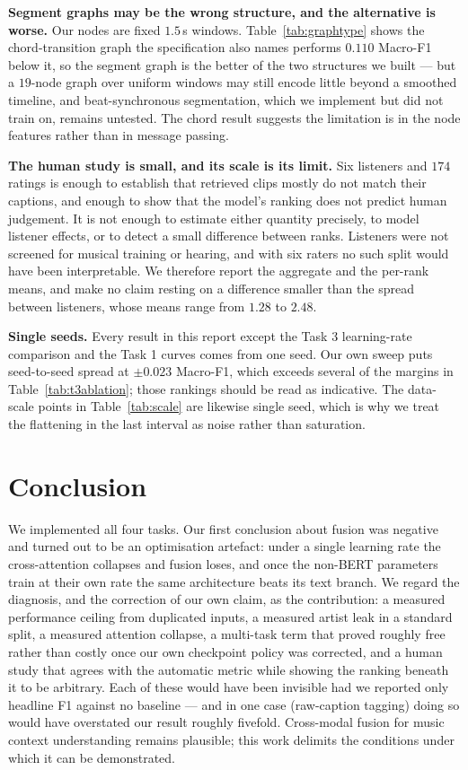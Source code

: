 \documentclass[conference]{IEEEtran}
\begin{document}
\textbf{Segment graphs may be the wrong structure, and the alternative is
worse.} Our nodes are fixed $1.5$\,s windows. Table~\ref{tab:graphtype} shows
the chord-transition graph the specification also names performs $0.110$
Macro-F1 below it, so the segment graph is the better of the two structures we
built --- but a $19$-node graph over uniform windows may still encode little
beyond a smoothed timeline, and beat-synchronous segmentation, which we
implement but did not train on, remains untested. The chord result suggests the
limitation is in the node features rather than in message passing.

\textbf{The human study is small, and its scale is its limit.} Six listeners
and $174$ ratings is enough to establish that retrieved clips mostly do not
match their captions, and enough to show that the model's ranking does not
predict human judgement. It is not enough to estimate either quantity
precisely, to model listener effects, or to detect a small difference between
ranks. Listeners were not screened for musical training or hearing, and with
six raters no such split would have been interpretable. We therefore report the
aggregate and the per-rank means, and make no claim resting on a difference
smaller than the spread between listeners, whose means range from $1.28$ to
$2.48$.

\textbf{Single seeds.} Every result in this report except the Task 3
learning-rate comparison and the Task 1 curves comes from one seed. Our own
sweep puts seed-to-seed spread at $\pm0.023$ Macro-F1, which exceeds several of
the margins in Table~\ref{tab:t3ablation}; those rankings should be read as
indicative. The data-scale points in Table~\ref{tab:scale} are likewise single
seed, which is why we treat the flattening in the last interval as noise rather
than saturation.

\section{Conclusion}
We implemented all four tasks. Our first conclusion about fusion was negative
and turned out to be an optimisation artefact: under a single learning rate the
cross-attention collapses and fusion loses, and once the non-BERT parameters
train at their own rate the same architecture beats its text branch. We regard
the diagnosis, and the correction of our own claim, as the contribution: a measured
performance ceiling from duplicated inputs, a measured artist leak in a
standard split, a measured attention collapse, a multi-task term that proved
roughly free rather than costly once our own checkpoint policy was corrected,
and a human study that agrees with the automatic metric while showing the
ranking beneath it to be arbitrary. Each of these would have been invisible had we reported only
headline F1 against no baseline --- and in one case (raw-caption tagging) doing
so would have overstated our result roughly fivefold. Cross-modal fusion for
music context understanding remains plausible; this work delimits the
conditions under which it can be demonstrated.
\end{document}
